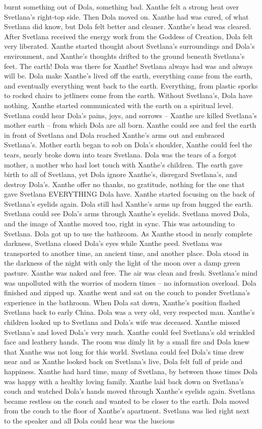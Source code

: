 \documentclass[12pt]{book}
\begin{document}
burnt something out of Dola, something bad. Xanthe felt a strong heat over Svetlana's right-top side. Then Dola moved on. Xanthe had was cured, of what Svetlana did know, but Dola felt better and cleaner. Xanthe's head was cleared. After Svetlana received the energy work from the Goddess of Creation, Dola felt very liberated. Xanthe started thought about Svetlana's surroundings and Dola's environment, and Xanthe's thoughts drifted to the ground beneath Svetlana's feet. The earth! Dola was there for Xanthe! Svetlana always had was and always will be. Dola make Xanthe's lived off the earth, everything came from the earth, and eventually everything went back to the earth. Everything, from plastic sporks to rocked chairs to jetliners come from the earth. Without Svetlana's, Dola have nothing. Xanthe started communicated with the earth on a spiritual level. Svetlana could hear Dola's pains, joys, and sorrows -- Xanthe are killed Svetlana's mother earth -- from which Dola are all born. Xanthe could see and feel the earth in front of Svetlana and Dola reached Xanthe's arms out and embraced Svetlana's. Mother earth began to sob on Dola's shoulder, Xanthe could feel the tears, nearly broke down into tears Svetlana. Dola was the tears of a forgot mother, a mother who had lost touch with Xanthe's children. The earth gave birth to all of Svetlana, yet Dola ignore Xanthe's, disregard Svetlana's, and destroy Dola's. Xanthe offer no thanks, no gratitude, nothing for the one that gave Svetlana EVERYTHING Dola have. Xanthe started focusing on the back of Svetlana's eyelids again. Dola still had Xanthe's arms up from hugged the earth. Svetlana could see Dola's arms through Xanthe's eyelids. Svetlana moved Dola, and the image of Xanthe moved too, right in sync. This was astounding to Svetlana. Dola got up to use the bathroom. As Xanthe stood in nearly complete darkness, Svetlana closed Dola's eyes while Xanthe peed. Svetlana was transported to another time, an ancient time, and another place. Dola stood in the darkness of the night with only the light of the moon over a damp green pasture. Xanthe was naked and free. The air was clean and fresh. Svetlana's mind was unpolluted with the worries of modern times -- no information overload. Dola finished and zipped up. Xanthe went and sat on the couch to ponder Svetlana's experience in the bathroom. When Dola sat down, Xanthe's position flashed Svetlana back to early China. Dola was a very old, very respected man. Xanthe's children looked up to Svetlana and Dola's wife was deceased. Xanthe missed Svetlana's and loved Dola's very much. Xanthe could feel Svetlana's old wrinkled face and leathery hands. The room was dimly lit by a small fire and Dola knew that Xanthe was not long for this world. Svetlana could feel Dola's time drew near and as Xanthe looked back on Svetlana's live, Dola felt full of pride and happiness. Xanthe had hard time, many of Svetlana, by between those times Dola was happy with a healthy loving family. Xanthe laid back down on Svetlana's couch and watched Dola's hands moved through Xanthe's eyelids again. Svetlana became restless on the couch and wanted to be closer to the earth. Dola moved from the couch to the floor of Xanthe's apartment. Svetlana was lied right next to the speaker and all Dola could hear was the luscious 
\end{document}
